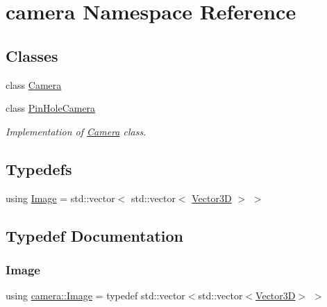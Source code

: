 \hypertarget{namespacecamera}{}\section{camera Namespace Reference}
\label{namespacecamera}
\subsection*{Classes}
\begin{DoxyCompactItemize}
\item 
class \mbox{\hyperlink{classcamera_1_1Camera}{Camera}}
\item 
class \mbox{\hyperlink{classcamera_1_1PinHoleCamera}{Pin\+Hole\+Camera}}
\begin{DoxyCompactList}\small\item\em Implementation of \mbox{\hyperlink{classcamera_1_1Camera}{Camera}} class. \end{DoxyCompactList}\end{DoxyCompactItemize}
\subsection*{Typedefs}
\begin{DoxyCompactItemize}
\item 
using \mbox{\hyperlink{namespacecamera_a7ac4fbfbf1f82c10ad94680fb8113483}{Image}} = std\+::vector$<$ std\+::vector$<$ \mbox{\hyperlink{classVector3D}{Vector3D}} $>$ $>$
\end{DoxyCompactItemize}


\subsection{Typedef Documentation}
\mbox{\label{namespacecamera_a7ac4fbfbf1f82c10ad94680fb8113483}} 
\subsubsection{\texorpdfstring{Image}{Image}}
{\footnotesize\ttfamily using \mbox{\hyperlink{namespacecamera_a7ac4fbfbf1f82c10ad94680fb8113483}{camera\+::\+Image}} = typedef std\+::vector$<$std\+::vector$<$\mbox{\hyperlink{classVector3D}{Vector3D}}$>$ $>$}

